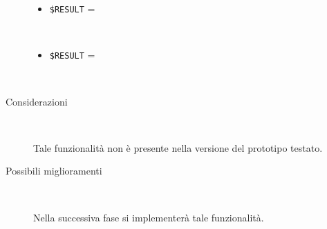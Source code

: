 \documentclass[../../Sperimentazione.tex]{subfiles}
\begin{document}
\begin{tcolorbox}[fonttitle=\bfseries, 
								adjusted title={\Large Prova 10A.1}, 
								breakable, 
								sharp corners=south,
								colback=white, 
								colframe=white!60!black]
\begin{description}[leftmargin=0.7cm,labelwidth=!]
					\tcbline        				
        				
        			\item[Output riscontrato] \ \par
        				\begin{description}
        				
        					\item[\dispositivoA] \ \par
        					\begin{itemize}
        						\item \verb|$RESULT| = \ns
        					\end{itemize}      					
        					
        					\item[\dispositivoB] \ \par
        					\begin{itemize}
        						\item \verb|$RESULT| = \ns
        					\end{itemize}
        					
        				\end{description}
        				
        			\tcbline
        			
        			\item[Analisi risultati] \ \par
        				\begin{description}
        					\item[Considerazioni] \ \par
        						Tale funzionalità non è presente nella versione del prototipo testato.
        					
        					\item[Possibili miglioramenti] \ \par 
        						Nella successiva fase si implementerà tale funzionalità.
        				\end{description}
        				
				\end{description}  
				
			\end{tcolorbox}



	
	\newpage		
\end{document}
